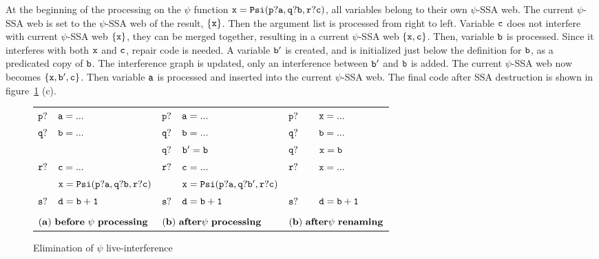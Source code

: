 At the beginning of the processing on the $\psi$ function ${\tt x =
  Psi(p?a,q?b,r?c)}$, all variables belong to their own $\psi$-SSA
web. The current $\psi$-SSA web is set to the $\psi$-SSA web of the
result, ${\tt \{x\}}$. Then the argument list is processed from right
to left. Variable ${\tt c}$ does not interfere with current $\psi$-SSA
web ${\tt \{x\}}$, they can be merged together, resulting in a current
$\psi$-SSA web ${\tt \{x, c\}}$. Then, variable ${\tt b}$ is
processed. Since it interferes with both ${\tt x}$ and ${\tt c}$,
repair code is needed. A variable ${\tt b'}$ is created, and is
initialized just below the definition for ${\tt b}$, as a predicated
copy of ${\tt b}$. The interference graph is updated, only an
interference between ${\tt b'}$ and ${\tt b}$ is added. The current
$\psi$-SSA web now becomes ${\tt \{x, b', c\}}$. Then variable ${\tt
  a}$ is processed and inserted into the current $\psi$-SSA web. The
final code after SSA destruction is shown in
figure~\ref{fig:live_interference} (c).

\begin{figure}
\begin{center}
\footnotesize
\begin{tabular}{llllll}
${\tt p?}$ & ${\tt a = ...}$              & ${\tt p?}$ & ${\tt a = ...}$                 & ${\tt p?}$ & ${\tt x = ...}$\\
${\tt q?}$ & ${\tt b = ...}$              & ${\tt q?}$ & ${\tt b = ...}$                 & ${\tt q?}$ & ${\tt b = ...}$\\
           &                              & ${\tt q?}$ & ${\tt b' = b}$                  & ${\tt q?}$ & ${\tt x = b}$\\
${\tt r?}$ & ${\tt c = ...}$              & ${\tt r?}$ & ${\tt c = ...}$                 & ${\tt r?}$ & ${\tt x = ...}$ \\
           & ${\tt x = Psi(p?a,q?b,r?c)}$ &            & ${\tt x = Psi(p?a,q?b',r?c)}$   &            & \\
${\tt s?}$ & ${\tt d = b+1}$              & ${\tt s?}$ & ${\tt d = b+1}$                 & ${\tt s?}$ & ${\tt d = b+1}$ \\
\\
\multicolumn{2}{l}{${\tt{\bf (a)\ before\ \psi\ processing}}$} & \multicolumn{2}{l}{${\tt{\bf (b)\ after \psi\ processing}}$} & \multicolumn{2}{l}{${\tt{\bf (b)\ after \psi\ renaming}}$} \\
\end{tabular}
\caption{Elimination of $\psi$ live-interference}
\label{fig:live_interference}
\end{center}
\end{figure}

